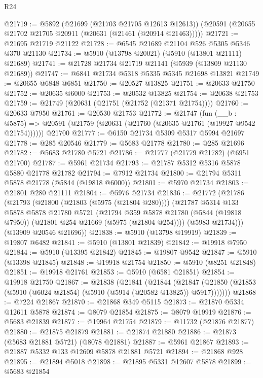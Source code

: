 \begin{lexlean}{R24}
\begin{coremodule}
@21719 := @5892
    (@21699 (@21703 @21705 @12613 @12613))
    (@20591 (@20655 @21702 @21705 @20911 (@20631 (@21461 (@20914 @21463)))))
@21721 := @21695 @21719 @21122
@21728 := @6545 @21689 @21104 @526 @5305 @5346 @370 @21130
@21734 := @5910 (@13798 @20021) (@5910 (@13801 @21111) @21689)
@21741 := @21728 @21734 @21719 @21141 (@5939 (@13809 @21130 @21689))
@21747 := @6841 @21734 @5318 @5335 @5345 @21698 @13821
@21749 := @20655 @6848 @6851
@21750 := @20527 @13825
@21751 := @20633 @21750
@21752 := @20635 @6000
@21753 := @20532 @13825
@21754 := @20638 @21753
@21759 := @21749 (@20631 (@21751 (@21752 (@21371 @21754))))
@21760 := @20633 @7950
@21761 := @20530 @21753
@21772 := @21747
    (fun (__b : @5875) => @20591 (@21759 (@20631 (@21760 (@20635 @21761 (@19927 @9542 @21754))))))
    @21700
@21777 := @6150 @21734 @5309 @5317 @5994 @21697
@21778 := @285 @20546
@21779 := @5683 @21778
@21780 := @285 @21696
@21782 := @5683 @21780 @5721
@21786 := @21777 (@21779 @21782) (@6951 @21700)
@21787 := @5961 @21734
@21793 := @21787 @5312 @5316 @5878 @5880 @21778 @21782
@21794 := @7912 @21734
@21800 := @21794 @5311 @5878 @21778 (@5844 (@19818 @6000))
@21801 := @5970 @21734
@21803 := @21801 @280 @21111
@21804 := @5976 @21734
@21836 := @21772
    (@21786
      (@21793
        (@21800 (@21803 (@5975 (@21804 @280))))
        (@21787
          @5314
          @133
          @5878
          @5878
          @21780
          @5721
          (@21794
            @359
            @5878
            @21780
            (@5844 (@19818 @7950))
            (@21801 @254 @21669 (@5975 (@21804 @254))))
          (@5983 @21734)))
      (@13909 @20546 @21696))
@21838 := @5910 (@13798 @19919)
@21839 := @19807 @6482
@21841 := @5910 (@13801 @21839)
@21842 := @19918 @7950
@21844 := @5910 (@13395 @21842)
@21845 := @19807 @9542
@21847 := @5910 (@13398 @21845)
@21848 := @19918 @21754
@21850 := @5910 (@8251 @21848)
@21851 := @19918 @21761
@21853 := @5910 (@6581 @21851)
@21854 := @19918 @21750
@21867 := @21838
    (@21841
      (@21844
        (@21847 (@21850 (@21853 (@5910 (@6024 @21854) (@5910 (@5914 (@20582 @13825)) @5917)))))))
@21868 := @7224 @21867
@21870 := @21868 @349 @5115
@21873 := @21870 @5334 @12611 @5878
@21874 := @8079 @21854
@21875 := @8079 @19919
@21876 := @5683 @21839
@21877 := @19964 @21754
@21879 := @11732 (@21876 @21877)
@21880 := @21875 @21879
@21881 := @21874 @21880
@21886 := @21873 (@5683 @21881 @5721) (@8078 @21881)
@21887 := @5961 @21867
@21893 := @21887 @5332 @133 @12609 @5878 @21881 @5721
@21894 := @21868 @928
@21895 := @21894 @5018
@21898 := @21895 @5331 @12607 @5878
@21899 := @5683 @21854

\end{coremodule}
\end{lexlean}
